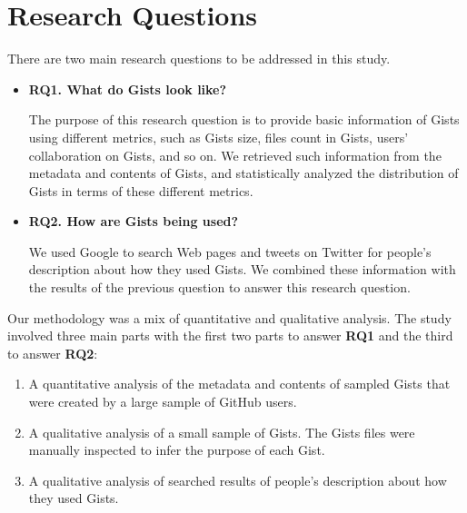 \section{Research Questions}

There are two main research questions to be addressed in this study.  
\begin{itemize}

  \item {\bf RQ1. What do Gists look like?}
   
  The purpose of this research question is to provide basic information of Gists using different metrics, such as Gists size, files count in Gists, users' collaboration on Gists, and so on. We retrieved such information from the metadata and contents of Gists, and statistically analyzed the distribution of Gists in terms of these different metrics.


  \item {\bf RQ2. How are Gists being used?}

  We used Google to search Web pages and tweets on Twitter for people's description about how they used Gists. We combined these information with the results of the previous question to answer this research question.

\end{itemize}

Our methodology was a mix of quantitative and qualitative analysis. The study involved three main parts with the first two parts to answer {\bf RQ1} and the third to answer {\bf RQ2}:

\begin{enumerate}

  \item A quantitative analysis of the metadata and contents of sampled Gists that were created by a large sample of GitHub users.

  \item A qualitative analysis of a small sample of Gists. The Gists files were manually inspected to infer the purpose of each Gist.

  \item A qualitative analysis of searched results of people's description about how they used Gists. 
\end{enumerate}
